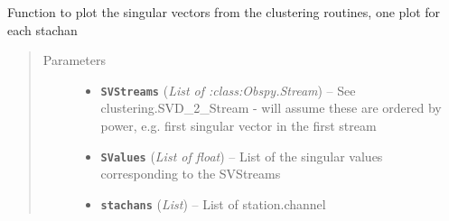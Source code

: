 \documentclass[a4paper,10pt,english]{sphinxmanual}
\begin{document}
\begin{fulllineitems}
\label{submodules/utils.EQcorrscan_plotting:EQcorrscan_plotting.SVD_plot}
Function to plot the singular vectors from the clustering routines, one
plot for each stachan
\begin{quote}\begin{description}
\item[{Parameters}] \leavevmode\begin{itemize}
\item {} 
\textbf{\texttt{SVStreams}} (\emph{List of :class:Obspy.Stream}) -- See clustering.SVD\_2\_Stream - will assume these are            ordered by power, e.g. first singular vector in the first stream

\item {} 
\textbf{\texttt{SValues}} (\emph{List of float}) -- List of the singular values corresponding to the SVStreams

\item {} 
\textbf{\texttt{stachans}} (\emph{List}) -- List of station.channel

\end{itemize}

\end{description}\end{quote}

\end{fulllineitems}

\end{document}
